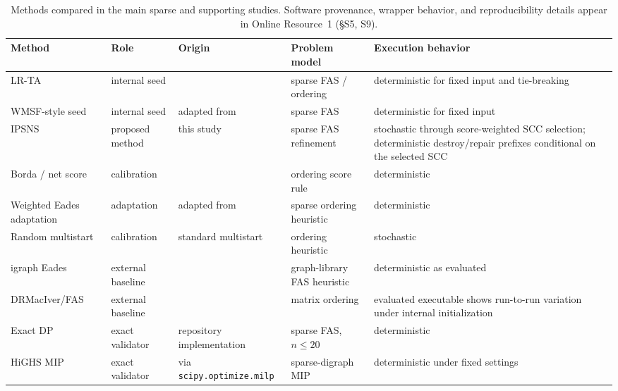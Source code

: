 \begin{table}[t]
\centering
\footnotesize
\caption{Methods compared in the main sparse and supporting studies. Software provenance, wrapper behavior, and reproducibility details appear in Online Resource~1 (\S S5, S9).}
\label{tab:baseline-provenance}
\begin{tabularx}{\linewidth}{@{}>{\raggedright\arraybackslash}p{2.1cm}>{\raggedright\arraybackslash}p{1.5cm}>{\raggedright\arraybackslash}p{2.0cm}>{\raggedright\arraybackslash}p{2.2cm}>{\raggedright\arraybackslash}X@{}}
\toprule
Method & Role & Origin & Problem model & Execution behavior \\
\midrule
LR-TA & internal seed & \cite{DF03,VahidiKoutis2024arxiv} & sparse FAS / ordering & deterministic for fixed input and tie-breaking \\
WMSF-style seed & internal seed & adapted from \cite{CC25,CCP24} & sparse FAS & deterministic for fixed input \\
IPSNS & proposed method & this study & sparse FAS refinement & stochastic through score-weighted SCC selection; deterministic destroy/repair prefixes conditional on the selected SCC \\
Borda / net score & calibration & \cite{CFR10} & ordering score rule & deterministic \\
Weighted Eades adaptation & adaptation & adapted from \cite{ELS93,EL95} & sparse ordering heuristic & deterministic \\
Random multistart & calibration & standard multistart & ordering heuristic & stochastic \\
igraph Eades & external baseline & \cite{python_igraph_feedback_arc_set} & graph-library FAS heuristic & deterministic as evaluated \\
DRMacIver/FAS & external baseline & \cite{drmaciver_feedback_arc_set} & matrix ordering & evaluated executable shows run-to-run variation under internal initialization \\
Exact DP & exact validator & repository implementation & sparse FAS, \(n\le 20\) & deterministic \\
HiGHS MIP & exact validator & \cite{HuangfuHall2018} via \texttt{scipy.optimize.milp} & sparse-digraph MIP & deterministic under fixed settings \\
\bottomrule
\end{tabularx}
\end{table}
